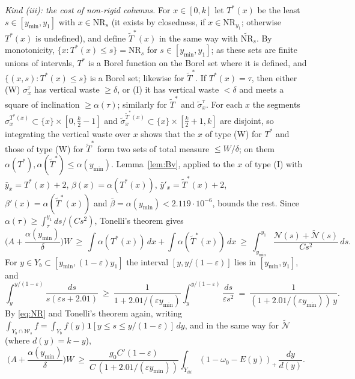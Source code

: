 \documentclass[11pt]{amsart}
\theoremstyle{definition}
\theoremstyle{remark}
\begin{document}
\smallskip\noindent\emph{Kind (iii): the cost of non-rigid columns.}
For $x\in[0,k]$ let $T^*(x)$ be the least $s\in[y_{\min},y_1]$ with $x\in\mathrm{NR}_s$ (it exists by closedness, if
$x\in\mathrm{NR}_{y_1}$; otherwise $T^*(x)$ is undefined), and define $\widetilde T^*(x)$ in the same way with $\widetilde{\mathrm{NR}}_s$.
By monotonicity, $\{x:T^*(x)\le s\}=\mathrm{NR}_s$ for $s\in[y_{\min},y_1]$; as these sets are finite unions of intervals, $T^*$ is a Borel
function on the Borel set where it is defined, and $\{(x,s):T^*(x)\le s\}$ is a Borel set; likewise for $\widetilde T^*$.
If $T^*(x)=\tau$, then either (W) $\sigma^\tau_x$ has vertical waste $\ge\delta$, or (I) it has vertical waste $<\delta$ and meets a
square of inclination $\ge\alpha(\tau)$; similarly for $\widetilde T^*$ and $\tilde\sigma^\tau_x$. For each $x$ the segments
$\sigma^{T^*(x)}_x\subset\{x\}\times[0,\frac k2-1]$ and $\tilde\sigma^{\widetilde T^*(x)}_x\subset\{x\}\times[\frac k2+1,k]$ are disjoint, so
integrating the vertical waste over $x$ shows that the $x$ of type (W) for $T^*$ and those of type (W) for $\widetilde T^*$
form two sets of total measure $\le W/\delta$; on them $\alpha(T^*),\alpha(\widetilde T^*)\le\alpha(y_{\min})$. Lemma~\ref{lem:Bv}, applied to the
$x$ of type (I) with $\bar y_x=T^*(x)+2$, $\beta(x)=\alpha(T^*(x))$, $\bar y'_x=\widetilde T^*(x)+2$, $\beta'(x)=\alpha(\widetilde T^*(x))$ and
$\bar\beta=\alpha(y_{\min})<2.119\cdot10^{-6}$, bounds the rest. Since $\alpha(\tau)\ge\int_\tau^{y_1}ds/(Cs^2)$, Tonelli's theorem gives
\[
\Big(A+\frac{\alpha(y_{\min})}\delta\Big)W\ \ge\ \int\alpha(T^*(x))\,dx+\int\alpha(\widetilde T^*(x))\,dx\ \ge\ \int_{y_{\min}}^{y_1}\frac{\mathcal N(s)+\widetilde{\mathcal N}(s)}{Cs^2}\,ds .
\]
For $y\in Y_b\subset[y_{\min},(1-\varepsilon)y_1]$ the interval $[y,y/(1-\varepsilon)]$ lies in $[y_{\min},y_1]$, and
\[
\int_y^{y/(1-\varepsilon)}\frac{ds}{s(\varepsilon s+2.01)}\ \ge\ \frac1{1+2.01/(\varepsilon y_{\min})}\int_y^{y/(1-\varepsilon)}\frac{ds}{\varepsilon s^2}
\ =\ \frac1{(1+2.01/(\varepsilon y_{\min}))\,y} .
\]
By \eqref{eq:NR} and Tonelli's theorem again, writing $\int_{Y_b\cap\mathcal W_s}f=\int_{Y_b}f(y)\mathbf 1[y\le s\le y/(1-\varepsilon)]\,dy$, and in
the same way for $\widetilde{\mathcal N}$ (where $d(y)=k-y$),
\[
\Big(A+\frac{\alpha(y_{\min})}\delta\Big)W\ \ge\ \frac{g_0C'(1-\varepsilon)}{C\,(1+2.01/(\varepsilon y_{\min}))}\int_{Y_{iii}}(1-\omega_0-E(y))_+\,\frac{dy}{d(y)} .
\]
\end{document}
